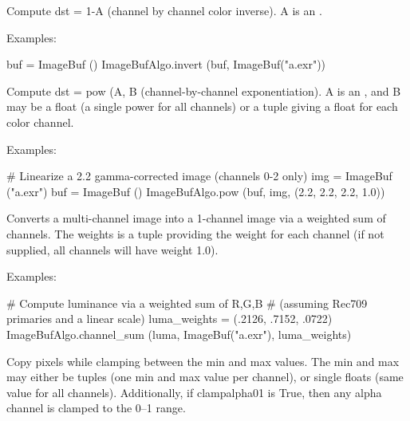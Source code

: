  

Compute {\cf dst = 1-A} (channel by channel color inverse).
{\cf A} is an \ImageBuf.

\smallskip
\noindent Examples:
\begin{code}
    buf = ImageBuf ()
    ImageBufAlgo.invert (buf, ImageBuf("a.exr"))
\end{code}
\apiend


 

Compute {\cf dst} = {\cf pow (A, B} (channel-by-channel exponentiation).
{\cf A} is an \ImageBuf, and {\cf B} may be a {\cf float} (a single power
for all channels) or a tuple giving a {\cf float} for each color channel.

\smallskip
\noindent Examples:
\begin{code}
    # Linearize a 2.2 gamma-corrected image (channels 0-2 only)
    img = ImageBuf ("a.exr")
    buf = ImageBuf ()
    ImageBufAlgo.pow (buf, img, (2.2, 2.2, 2.2, 1.0))
\end{code}
\apiend


 
Converts a multi-channel image into a 1-channel image via a weighted sum
of channels. The {\cf weights} is a tuple providing the weight for each 
channel (if not supplied, all channels will have weight 1.0).

\smallskip
\noindent Examples:
\begin{code}
    # Compute luminance via a weighted sum of R,G,B
    # (assuming Rec709 primaries and a linear scale)
    luma_weights = (.2126, .7152, .0722)
    ImageBufAlgo.channel_sum (luma, ImageBuf("a.exr"), luma_weights)
\end{code}
\apiend


 

Copy pixels while clamping
between the {\cf min} and {\cf max} values.  The {\cf min} and {\cf max}
may either be tuples (one min and max value per channel), or single
{\cf floats} (same value for all channels).  Additionally, if
{\cf clampalpha01} is {\cf True}, then any alpha 
channel is clamped to the 0--1 range.

